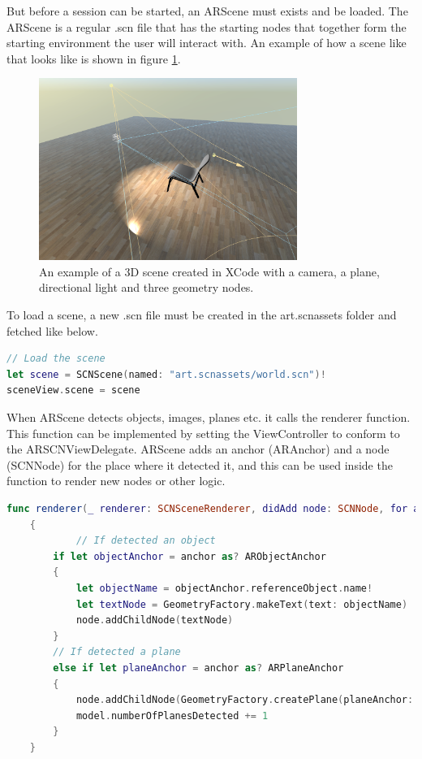 But before a session can be started, an ARScene must exists and be loaded. The ARScene is a regular .scn file that has the starting nodes that together form the starting
environment the user will interact with. An example of how a scene like that looks like is shown in figure \ref{fig:3dsceneImage}.

\begin{figure}[hbtp]
\begin{center}
\includegraphics[width = 0.75\textwidth]{./Images/3dscene.jpg} 
\caption{An example of a 3D scene created in XCode with a camera, a plane, directional light and three geometry nodes.}
\label{fig:3dsceneImage}
\end{center}
\end{figure}

To load a scene, a new .scn file must be created in the art.scnassets folder and fetched like below.
\begin{lstlisting}[language=swift]
// Load the scene
let scene = SCNScene(named: "art.scnassets/world.scn")!        
sceneView.scene = scene
\end{lstlisting}

When ARScene detects objects, images, planes etc. it calls the renderer function. This function can be implemented by setting the ViewController to conform to the ARSCNViewDelegate. ARScene adds an anchor (ARAnchor) and a node (SCNNode) for the place where it detected it, and this can be used inside the function to render new nodes or other logic.

\begin{lstlisting}[language=swift]
func renderer(_ renderer: SCNSceneRenderer, didAdd node: SCNNode, for anchor: ARAnchor)
    {
    	    // If detected an object
        if let objectAnchor = anchor as? ARObjectAnchor
        {
            let objectName = objectAnchor.referenceObject.name!
            let textNode = GeometryFactory.makeText(text: objectName)
            node.addChildNode(textNode)
        }
        // If detected a plane
        else if let planeAnchor = anchor as? ARPlaneAnchor
        {
            node.addChildNode(GeometryFactory.createPlane(planeAnchor: planeAnchor, metalDevice: metalDevice!))
            model.numberOfPlanesDetected += 1
        }
    }
\end{lstlisting}

